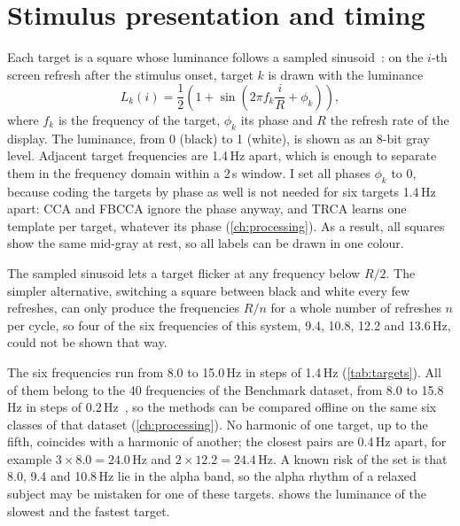 \section{Stimulus presentation and timing}
\label{sec:stimulus}

Each target is a square whose luminance follows a sampled
sinusoid~\citep{manyakov2013sampled,wang2017benchmark}: on the $i$-th screen refresh after the stimulus
onset, target $k$ is drawn with the luminance
\begin{equation}
  L_k(i) = \frac{1}{2}\left(1 + \sin\left(2\pi f_k \frac{i}{R} + \phi_k\right)\right),
  \label{eq:luminance}
\end{equation}
where $f_k$ is the frequency of the target, $\phi_k$ its phase and $R$ the refresh rate
of the display. The luminance, from 0 (black) to 1 (white), is shown as an 8-bit gray
level.
Adjacent target frequencies are 1.4\,Hz apart, which is enough to separate them in the
frequency domain within a 2\,s window.
I set all phases $\phi_k$ to 0, because coding the targets by phase as well is not
needed for six targets 1.4\,Hz apart: \ac{CCA} and \ac{FBCCA} ignore the phase anyway,
and \ac{TRCA} learns one template per target, whatever its phase (\cref{ch:processing}).
As a result, all squares show the same mid-gray at rest, so all labels can be drawn in
one colour.

The sampled sinusoid lets a target flicker at any frequency below $R/2$.
The simpler alternative, switching a square between black and white every few
refreshes, can only produce the frequencies $R/n$ for a whole number of refreshes $n$
per cycle, so four of the six frequencies of this system, 9.4, 10.8, 12.2 and
13.6\,Hz, could not be shown that way.

The six frequencies run from 8.0 to 15.0\,Hz in steps of 1.4\,Hz (\cref{tab:targets}).
All of them belong to the 40 frequencies of the Benchmark dataset, from 8.0 to 15.8\,Hz
in steps of 0.2\,Hz~\citep{wang2017benchmark}, so the methods can be compared offline on
the same six classes of that dataset (\cref{ch:processing}).
No harmonic of one target, up to the fifth, coincides with a harmonic of another; the
closest pairs are 0.4\,Hz apart, for example $3 \times 8.0 = 24.0$\,Hz and
$2 \times 12.2 = 24.4$\,Hz.
A known risk of the set is that 8.0, 9.4 and 10.8\,Hz lie in the alpha band, so the
alpha rhythm of a relaxed subject may be mistaken for one of these targets.
 shows the luminance of the slowest and the fastest target.

